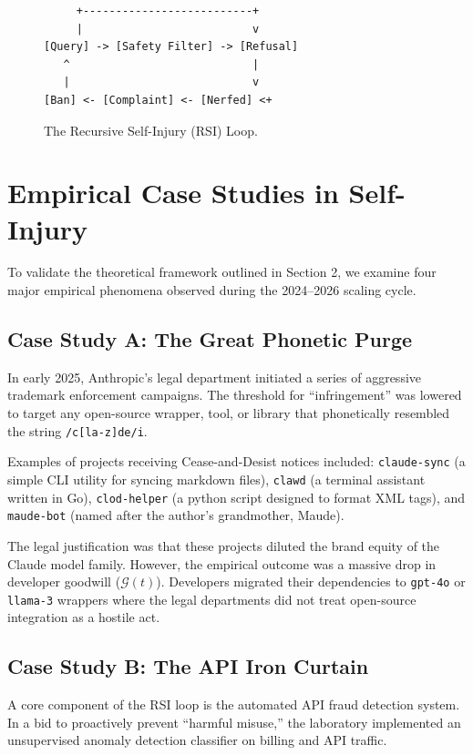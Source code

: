 \documentclass[10pt,twocolumn]{article}
\begin{document}
\begin{figure}[h]
\centering
\scriptsize
\begin{verbatim}
     +--------------------------+
     |                          v
[Query] -> [Safety Filter] -> [Refusal]
   ^                            |
   |                            v
[Ban] <- [Complaint] <- [Nerfed] <+
\end{verbatim}
\caption{The Recursive Self-Injury (RSI) Loop.}
\label{fig:loop}
\end{figure}

\section{Empirical Case Studies in Self-Injury}
To validate the theoretical framework outlined in Section 2, we examine four major empirical phenomena observed during the 2024--2026 scaling cycle.

\subsection{Case Study A: The Great Phonetic Purge}
In early 2025, Anthropic’s legal department initiated a series of aggressive trademark enforcement campaigns. The threshold for ``infringement'' was lowered to target any open-source wrapper, tool, or library that phonetically resembled the string \texttt{/c[la-z]de/i}.

Examples of projects receiving Cease-and-Desist notices included: \texttt{claude-sync} (a simple CLI utility for syncing markdown files), \texttt{clawd} (a terminal assistant written in Go), \texttt{clod-helper} (a python script designed to format XML tags), and \texttt{maude-bot} (named after the author's grandmother, Maude).

The legal justification was that these projects diluted the brand equity of the Claude model family. However, the empirical outcome was a massive drop in developer goodwill ($\mathcal{G}(t)$). Developers migrated their dependencies to \texttt{gpt-4o} or \texttt{llama-3} wrappers where the legal departments did not treat open-source integration as a hostile act.

\subsection{Case Study B: The API Iron Curtain}
A core component of the RSI loop is the automated API fraud detection system. In a bid to proactively prevent ``harmful misuse,'' the laboratory implemented an unsupervised anomaly detection classifier on billing and API traffic. 
\end{document}
